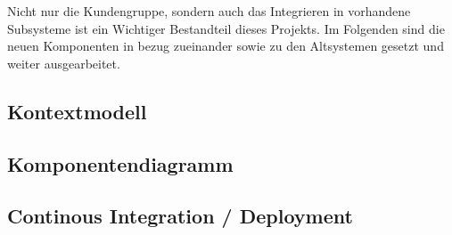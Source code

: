 Nicht nur die Kundengruppe, sondern auch das Integrieren in vorhandene Subsysteme ist ein Wichtiger Bestandteil dieses Projekts. Im Folgenden sind die neuen Komponenten in bezug zueinander sowie zu den Altsystemen gesetzt und weiter ausgearbeitet.

\subsection{Kontextmodell}\label{subsec:kontextmodell}
    

\subsection{Komponentendiagramm}\label{subsec:komponentendiagramm}
    

\subsection{Continous Integration / Deployment}\label{subsec:continous-integration-and-deployment}
    